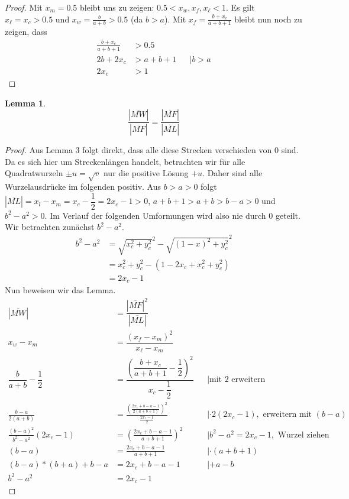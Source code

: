 \documentclass{article}
\newtheorem{lemma}{Lemma}
\newcommand{\strecke}[1]{\left|\overline{#1}\right|}
\begin{document}
	\begin{proof}
		Mit $x_m = 0.5$ bleibt uns zu zeigen: $0.5<x_w,x_f,x_\ell < 1$. Es gilt $x_\ell = x_c > 0.5$ und $x_w = \frac{b}{a+b} > 0.5$ (da $b>a$). Mit $x_f = \frac{b+x_c}{a+b+1}$ bleibt nun noch zu zeigen, dass
		\begin{align*}
			\frac{b+x_c}{a+b+1} &> 0.5\\
			2b+2x_c &> a+b+1&&|b>a\\
			2x_c &> 1
		\end{align*}
	\end{proof}
    \begin{lemma}\label{streckenverhaeltnis}
        \[\dfrac{\strecke{MW}}{\strecke{MF}} = \dfrac{\strecke{MF}}{\strecke{ML}}\]
    \end{lemma}
    \begin{proof}
    \allowdisplaybreaks
    Aus Lemma 3 folgt direkt, dass alle diese Strecken verschieden von 0 sind.
    Da es sich hier um Streckenlängen handelt, betrachten wir für alle Quadratwurzeln $\pm u = \sqrt{v}$ nur die positive Lösung $+u$. Daher sind alle Wurzelausdrücke im folgenden positiv.
    Aus $b>a>0$ folgt $\strecke{ML} = x_l-x_m = x_c-\dfrac{1}{2} = 2x_c-1> 0$, $a+b+1>a+b> b-a>0$ und $b^2-a^2>0$. Im Verlauf der folgenden Umformungen wird also nie durch 0 geteilt. Wir betrachten zunächst $b^2-a^2$.
    \begin{align*}
    b^2-a^2&=\sqrt{x_c^2+y_c^2}^2-\sqrt{(1-x)^2+y_c^2}^2\\
    &=x_c^2+y_c^2 - (1-2x_c+x_c^2+y_c^2)\\
    &=2x_c-1
    \end{align*}
    Nun beweisen wir das Lemma.
    \begin{align*}
        \strecke{MW} &= \dfrac{\strecke{MF}^2}{\strecke{ML}}\\
        x_w-x_m &= \dfrac{(x_f-x_m)^2}{x_\ell-x_m}\\
        \dfrac{b}{a+b}-\dfrac{1}{2} &= \dfrac{\left(\dfrac{b+x_c}{a+b+1}-\dfrac{1}{2}\right)^2}{x_c-\dfrac{1}{2}}&&\left|
    \text{mit 2 erweitern}\right.\\
        \frac{b-a}{2(a+b)} &= \frac{\left(\frac{2x_c+b-a-1}{2(a+b+1)}\right)^2}{\frac{2x_c-1}{2}}&&|\cdot 2(2x_c-1), \text{ erweitern mit $(b-a)$}\\
        \frac{(b-a)^2}{b^2-a^2}(2x_c-1)&= \left(\frac{2x_c+b-a-1}{a+b+1}\right)^2&&|b^2-a^2 = 2x_c-1,\text{ Wurzel ziehen}\\
        (b-a) &= \frac{2x_c+b-a-1}{a+b+1}&&|\cdot (a+b+1)\\
        (b-a)*(b+a) + b-a&= 2x_c+b-a-1&&|+a-b\\
        b^2-a^2&= 2x_c-1
    \end{align*}
    \end{proof}
\end{document}

